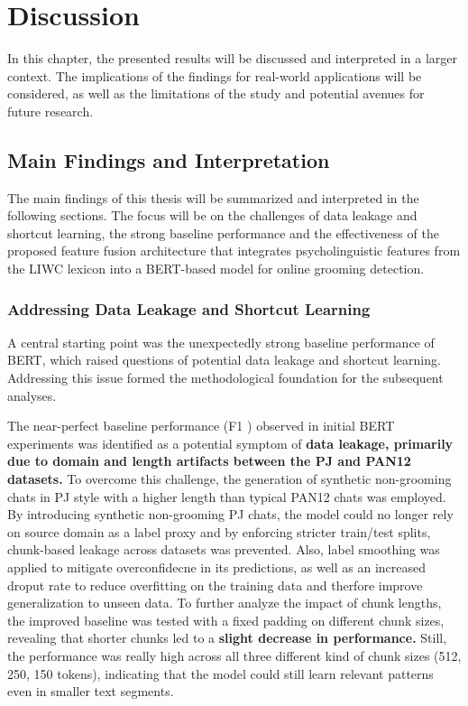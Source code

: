 \chapter{Discussion}
In this chapter, the presented results will be discussed and interpreted in a larger context. The implications of the findings for real-world applications will be considered, as well as the limitations of the study and potential avenues for future research.


\section{Main Findings and Interpretation}

The main findings of this thesis will be summarized and interpreted in the following sections. The focus will be on the challenges of data leakage and shortcut learning, the strong baseline performance and the effectiveness of the proposed feature fusion architecture that integrates psycholinguistic features from the LIWC lexicon into a BERT-based model for online grooming detection. 



\subsection{Addressing Data Leakage and Shortcut Learning}
A central starting point was the unexpectedly strong baseline performance of BERT, which raised questions of potential data leakage and shortcut learning. Addressing this issue formed the methodological foundation for the subsequent analyses.

The near-perfect baseline performance (F1 ) observed in initial BERT experiments was identified as a potential symptom of \textbf{data leakage, primarily due to domain and length artifacts between the PJ and PAN12 datasets.} To overcome this challenge, the generation of synthetic non-grooming chats in PJ style with a higher length than typical PAN12 chats was employed. By introducing synthetic non-grooming PJ chats, the model could no longer rely on source domain as a label proxy and by enforcing stricter train/test splits, chunk-based leakage across datasets was prevented. Also, label smoothing was applied to mitigate overconfidecne in its predictions, as well as an increased droput rate to reduce overfitting on the training data and therfore improve generalization to unseen data. To further analyze the impact of chunk lengths, the improved baseline was tested with a fixed padding on different chunk sizes, revealing that shorter chunks led to a \textbf{slight decrease in performance.} Still, the performance was really high across all three different kind of chunk sizes (512, 250, 150 tokens), indicating that the model could still learn relevant patterns even in smaller text segments. 


